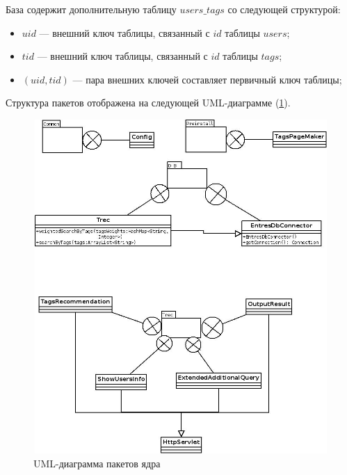 База содержит дополнительную таблицу $users\_tags$ со следующей структурой:
\begin{itemize}
\item $uid$ --- внешний ключ таблицы, связанный с $id$ таблицы $users$;
\item $tid$ --- внешний ключ таблицы, связанный с $id$ таблицы $tags$;
\item $(uid, tid)$ --- пара внешних ключей составляет первичный ключ таблицы;
\end{itemize}

Структура пакетов отображена на следующей UML-диаграмме (\ref{pic:lf-packs}).
\begin{figure}
	\label{pic:lf-packs}
\caption{UML-диаграмма пакетов ядра}
\begin{center}
  \includegraphics[width=5in,height=5in]{pics/core-packs-lastfm.jpeg}
\end{center}
\end{figure}


